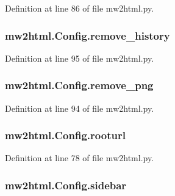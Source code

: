 Definition at line 86 of file mw2html.\+py.

\subsubsection[{\texorpdfstring{remove\+\_\+history}{remove_history}}]{\setlength{\rightskip}{0pt plus 5cm}mw2html.\+Config.\+remove\+\_\+history}\hypertarget{classmw2html_1_1_config_a98d73e496d59f4e522045095cf2e0f23}{}\label{classmw2html_1_1_config_a98d73e496d59f4e522045095cf2e0f23}


Definition at line 95 of file mw2html.\+py.

\subsubsection[{\texorpdfstring{remove\+\_\+png}{remove_png}}]{\setlength{\rightskip}{0pt plus 5cm}mw2html.\+Config.\+remove\+\_\+png}\hypertarget{classmw2html_1_1_config_acdd599198ca8204d5e5054bb8195882a}{}\label{classmw2html_1_1_config_acdd599198ca8204d5e5054bb8195882a}


Definition at line 94 of file mw2html.\+py.

\subsubsection[{\texorpdfstring{rooturl}{rooturl}}]{\setlength{\rightskip}{0pt plus 5cm}mw2html.\+Config.\+rooturl}\hypertarget{classmw2html_1_1_config_aeb12a940f1165d5abf67ba33dae59d28}{}\label{classmw2html_1_1_config_aeb12a940f1165d5abf67ba33dae59d28}


Definition at line 78 of file mw2html.\+py.

\subsubsection[{\texorpdfstring{sidebar}{sidebar}}]{\setlength{\rightskip}{0pt plus 5cm}mw2html.\+Config.\+sidebar}\hypertarget{classmw2html_1_1_config_a070def28f1e3b7098a17cd0ce75f92e0}{}\label{classmw2html_1_1_config_a070def28f1e3b7098a17cd0ce75f92e0}


